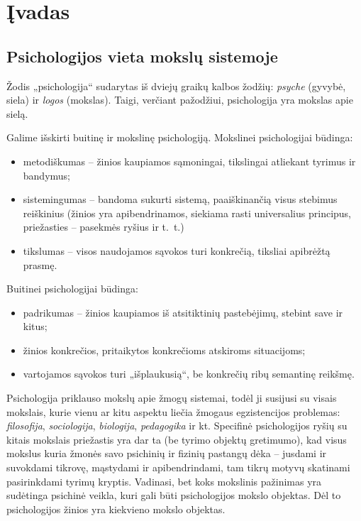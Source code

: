 \chapter{Įvadas}

\section{Psichologijos vieta mokslų sistemoje}

\label{tema:psichologijos_mokslas}

Žodis „\gls{psichologija}“ sudarytas iš dviejų graikų kalbos žodžių: 
\emph{psyche} (gyvybė, \gls{siela}) ir \emph{logos} (mokslas). Taigi, 
verčiant pažodžiui, \gls{psichologija} yra mokslas apie sielą.

Galime išskirti buitinę ir mokslinę psichologiją. Mokslinei psichologijai
būdinga:
\begin{itemize}
  \item metodiškumas – žinios kaupiamos sąmoningai, tikslingai atliekant
    tyrimus ir bandymus;
  \item sistemingumas – bandoma sukurti sistemą, paaiškinančią visus 
    stebimus reiškinius (žinios yra apibendrinamos, siekiama rasti 
    universalius principus, priežasties – pasekmės ryšius ir t.~t.)
  \item tikslumas – visos naudojamos sąvokos turi konkrečią, tiksliai
    apibrėžtą prasmę.
\end{itemize}
Buitinei psichologijai būdinga:
\begin{itemize}
  \item padrikumas – žinios kaupiamos iš atsitiktinių pastebėjimų, 
    stebint save ir kitus;
  \item žinios konkrečios, pritaikytos konkrečioms atskiroms situacijoms;
  \item vartojamos sąvokos turi „išplaukusią“, be konkrečių ribų 
    semantinę reikšmę.
\end{itemize}

Psichologija priklauso mokslų apie žmogų sistemai, todėl ji susijusi su
visais mokslais, kurie vienu ar kitu aspektu liečia žmogaus egzistencijos 
problemas: \emph{filosofija}, \emph{sociologija}, \emph{biologija},
\emph{pedagogika} ir kt. Specifinė psichologijos ryšių su kitais mokslais
priežastis yra dar ta (be tyrimo objektų gretimumo), kad visus mokslus
kuria žmonės savo psichinių ir fizinių pastangų dėka – jusdami ir suvokdami
tikrovę, mąstydami ir apibendrindami, tam tikrų motyvų skatinami 
pasirinkdami tyrimų kryptis. Vadinasi, bet koks mokslinis pažinimas yra 
sudėtinga psichinė veikla, kuri gali būti psichologijos mokslo objektas.
Dėl to psichologijos žinios yra kiekvieno mokslo objektas.

